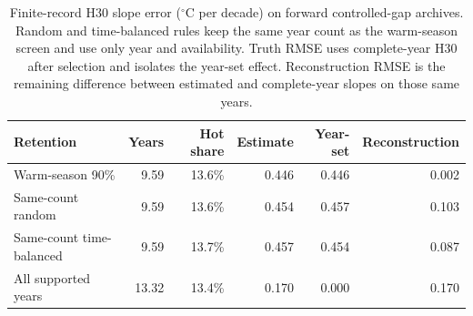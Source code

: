 \begin{table}[t]\centering\small
\caption{Finite-record H30 slope error ($^{\circ}$C per decade) on \PRTimeN{} forward controlled-gap archives. Random and time-balanced rules keep the same year count as the warm-season screen and use only year and availability. Truth RMSE uses complete-year H30 after selection and isolates the year-set effect. Reconstruction RMSE is the remaining difference between estimated and complete-year slopes on those same years.}
\label{tab:time-support-legacy-report}
\begin{tabular}{lrrrrr}
\toprule
Retention & Years & Hot share & Estimate & Year-set & Reconstruction \\
\midrule
Warm-season 90\% & 9.59 & 13.6\% & 0.446 & 0.446 & 0.002 \\
Same-count random & 9.59 & 13.6\% & 0.454 & 0.457 & 0.103 \\
Same-count time-balanced & 9.59 & 13.7\% & 0.457 & 0.454 & 0.087 \\
All supported years & 13.32 & 13.4\% & 0.170 & 0.000 & 0.170 \\
\bottomrule\end{tabular}
\end{table}
